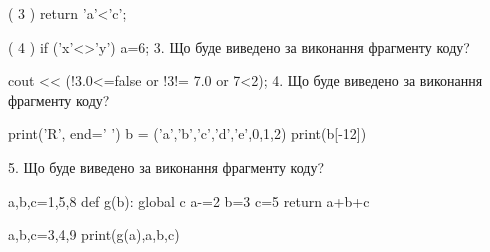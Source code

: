 \documentclass[11pt]{article}
\begin{document}
( 3 ) return 'a'<'c';

( 4 ) if ('x'<>'y') a=6;
\vspace{5mm}
3. Що буде виведено за виконання фрагменту коду?

cout << (!3.0<=false or !3!= 7.0 or 7<2);
\vspace{5mm}
4. Що буде виведено за виконання фрагменту коду?

print('R', end=' ')
b = ('a','b','c','d','e',0,1,2)
print(b[-12])

\vspace{5mm}
5. Що буде виведено за виконання фрагменту коду?

a,b,c=1,5,8
def g(b):
global c    a-=2
    b=3
    c=5
    return a+b+c

a,b,c=3,4,9
print(g(a),a,b,c)
\vspace{5mm}





\newpage
\end{document}
